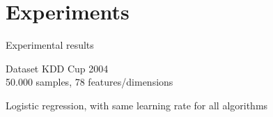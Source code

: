 \documentclass{beamer}
\numberwithin{equation}{aufgabe}
\begin{document}
\section{Experiments}
\begin{frame}{Experimental results}
    \begin{block}{Dataset}
        KDD Cup 2004\\
        50.000 samples, 78 features/dimensions
    \end{block}
    Logistic regression, with same learning rate for all algorithms
\end{frame}
\end{document}
